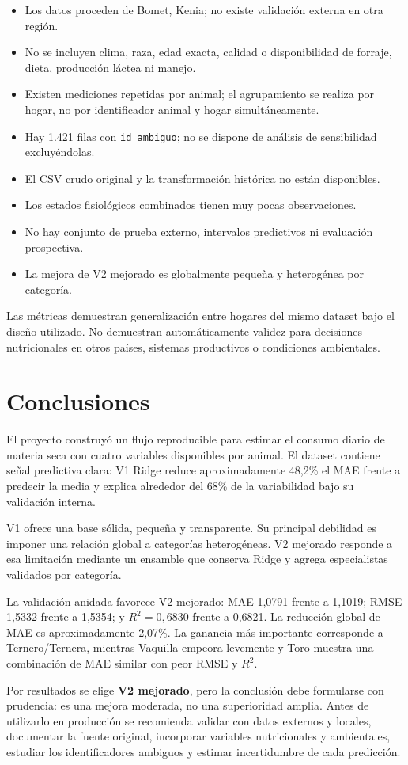 \documentclass[11pt,a4paper]{article}
\newcommand{\codigo}[1]{\nolinkurl{#1}}
\begin{document}
\begin{itemize}
  \item Los datos proceden de Bomet, Kenia; no existe validación externa en otra región.
  \item No se incluyen clima, raza, edad exacta, calidad o disponibilidad de forraje, dieta, producción láctea ni manejo.
  \item Existen mediciones repetidas por animal; el agrupamiento se realiza por hogar, no por identificador animal y hogar simultáneamente.
  \item Hay 1.421 filas con \codigo{id_ambiguo}; no se dispone de análisis de sensibilidad excluyéndolas.
  \item El CSV crudo original y la transformación histórica no están disponibles.
  \item Los estados fisiológicos combinados tienen muy pocas observaciones.
  \item No hay conjunto de prueba externo, intervalos predictivos ni evaluación prospectiva.
  \item La mejora de V2 mejorado es globalmente pequeña y heterogénea por categoría.
\end{itemize}

Las métricas demuestran generalización entre hogares del mismo dataset bajo el diseño utilizado. No demuestran automáticamente validez para decisiones nutricionales en otros países, sistemas productivos o condiciones ambientales.

\section{Conclusiones}

El proyecto construyó un flujo reproducible para estimar el consumo diario de materia seca con cuatro variables disponibles por animal. El dataset contiene señal predictiva clara: V1 Ridge reduce aproximadamente 48,2\% el MAE frente a predecir la media y explica alrededor del 68\% de la variabilidad bajo su validación interna.

V1 ofrece una base sólida, pequeña y transparente. Su principal debilidad es imponer una relación global a categorías heterogéneas. V2 mejorado responde a esa limitación mediante un ensamble que conserva Ridge y agrega especialistas validados por categoría.

La validación anidada favorece V2 mejorado: MAE 1,0791 frente a 1,1019; RMSE 1,5332 frente a 1,5354; y $R^2=0,6830$ frente a 0,6821. La reducción global de MAE es aproximadamente 2,07\%. La ganancia más importante corresponde a Ternero/Ternera, mientras Vaquilla empeora levemente y Toro muestra una combinación de MAE similar con peor RMSE y $R^2$.

Por resultados se elige \textbf{V2 mejorado}, pero la conclusión debe formularse con prudencia: es una mejora moderada, no una superioridad amplia. Antes de utilizarlo en producción se recomienda validar con datos externos y locales, documentar la fuente original, incorporar variables nutricionales y ambientales, estudiar los identificadores ambiguos y estimar incertidumbre de cada predicción.
\end{document}
